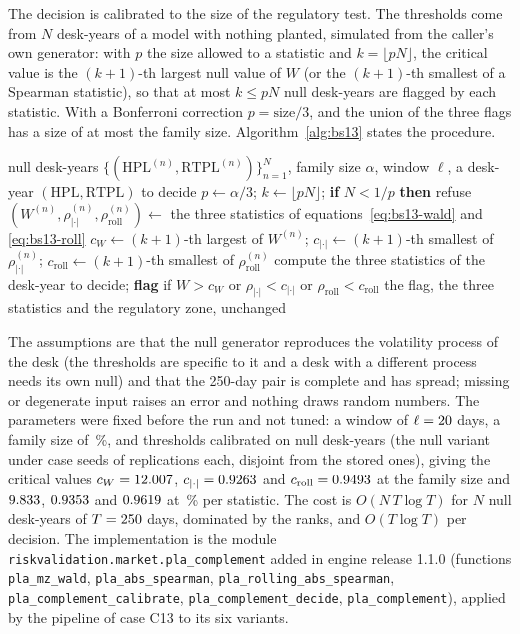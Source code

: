 The decision is calibrated to the size of the regulatory test. The thresholds come from $N$ desk-years of a model with nothing planted, simulated from the caller's own generator: with $p$ the size allowed to a statistic and $k=\lfloor pN\rfloor$, the critical value is the $(k+1)$-th largest null value of $W$ (or the $(k+1)$-th smallest of a Spearman statistic), so that at most $k\le pN$ null desk-years are flagged by each statistic. With a Bonferroni correction $p=\text{size}/3$, and the union of the three flags has a size of at most the family size. Algorithm~\ref{alg:bs13} states the procedure.

\begin{algorithm}[htbp]
\caption{Calibration and decision of the scale-and-level complement.}
\label{alg:bs13}
\begin{algorithmic}[1]
\Require null desk-years $\{(\mathrm{HPL}^{(n)},\mathrm{RTPL}^{(n)})\}_{n=1}^{N}$, family size $\alpha$, window $\ell$, a desk-year $(\mathrm{HPL},\mathrm{RTPL})$ to decide
\State $p\gets\alpha/3$; \quad $k\gets\lfloor pN\rfloor$; \quad \textbf{if} $N<1/p$ \textbf{then} refuse
  \State $(W^{(n)},\rho_{|\cdot|}^{(n)},\rho_{\mathrm{roll}}^{(n)})\gets$ the three statistics of equations~\eqref{eq:bs13-wald} and \eqref{eq:bs13-roll}
\EndFor
\State $c_{W}\gets(k{+}1)$-th largest of $W^{(n)}$; \quad $c_{|\cdot|}\gets(k{+}1)$-th smallest of $\rho_{|\cdot|}^{(n)}$; \quad $c_{\mathrm{roll}}\gets(k{+}1)$-th smallest of $\rho_{\mathrm{roll}}^{(n)}$
\State compute the three statistics of the desk-year to decide; \textbf{flag} if $W>c_W$ or $\rho_{|\cdot|}<c_{|\cdot|}$ or $\rho_{\mathrm{roll}}<c_{\mathrm{roll}}$
\State \Return the flag, the three statistics and the regulatory zone, unchanged
\end{algorithmic}
\end{algorithm}

The assumptions are that the null generator reproduces the volatility process of the desk (the thresholds are specific to it and a desk with a different process needs its own null) and that the 250-day pair is complete and has spread; missing or degenerate input raises an error and nothing draws random numbers. The parameters were fixed before the run and not tuned: a window of $\ell=20{}$ days, a family size of \pxThirteenSize{}\,\%, and thresholds calibrated on \pxThirteenNull{} null desk-years (the null variant under \pxThirteenNullSeeds{} case seeds of \pxThirteenNullBlock{} replications each, disjoint from the stored ones), giving the critical values $c_W=12.007$, $c_{|\cdot|}=0.9263$ and $c_{\mathrm{roll}}=0.9493$ at the family size and $9.833$, $0.9353$ and $0.9619$ at \pxThirteenSize{}\,\% per statistic. The cost is $O(N\,T\log T)$ for $N$ null desk-years of $T=250{}$ days, dominated by the ranks, and $O(T\log T)$ per decision. The implementation is the module \texttt{riskvalidation.market.pla\_complement} added in engine release 1.1.0 (functions \texttt{pla\_mz\_wald}, \texttt{pla\_abs\_spearman}, \texttt{pla\_rolling\_abs\_spearman}, \texttt{pla\_complement\_calibrate}, \texttt{pla\_complement\_decide}, \texttt{pla\_complement}), applied by the pipeline of case C13 to its six variants.

